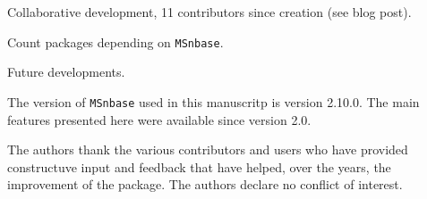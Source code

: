 \documentclass[journal=jacsat,manuscript=article]{achemso}\usepackage[]{graphicx}\usepackage[]{color}
\begin{document}
Collaborative development, 11 contributors since creation (see blog
post).

Count packages depending on \texttt{MSnbase}.

Future developments.

The version of \texttt{MSnbase} used in this manuscritp is version
2.10.0. The main features presented here
were available since version 2.0. 



\begin{acknowledgement}

The authors thank the various contributors and users who have provided
constructuve input and feedback that have helped, over the years, the
improvement of the package. The authors declare no conflict of
interest.

\end{acknowledgement}






\end{document}
